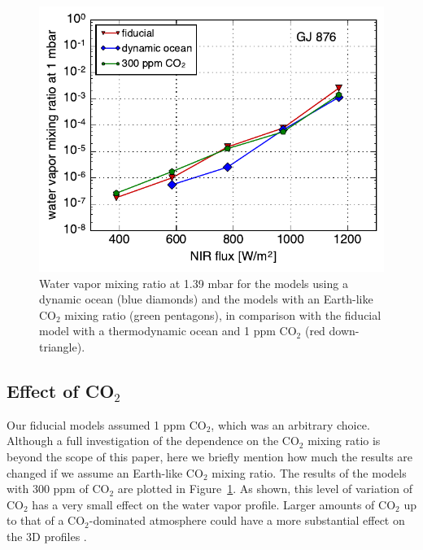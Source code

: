 \documentclass[11pt,numberedappendix,twocolappendix,]{emulateapj}
\def\wv{water vapor}
\begin{document}
\begin{figure}[!h]
    \begin{center}
    \includegraphics[width=0.9\hsize]{xH2O_sensitivity.pdf}
    \end{center}
\caption{Water vapor mixing ratio at 1.39 mbar for the models using a dynamic ocean (blue diamonds) and the models with an Earth-like CO$_2$ mixing ratio (green pentagons), in comparison with the fiducial model with a thermodynamic ocean and 1 ppm CO$_2$ (red down-triangle). }
\label{fig:change_ocean}
\end{figure}

\subsection{Effect of CO$_2$}
\label{ss:sensitivity_CO2}

Our fiducial models assumed 1 ppm CO$_2$, which was an arbitrary choice. 
Although a full investigation of the dependence on the CO$_2$ mixing ratio is beyond the scope of this paper, here we briefly mention how much the results are changed if we assume an Earth-like CO$_2$ mixing ratio. 
The results of the models with 300 ppm of CO$_2$ are plotted in Figure~\ref{fig:change_ocean}. 
As shown, this level of variation of CO$_2$ has a very small effect on the \wv{} profile. 
Larger amounts of CO$_2$ up to that of a CO$_2$-dominated atmosphere could have a more substantial effect on the 3D profiles \citep{Wordsworth2013}. 


\end{document}
